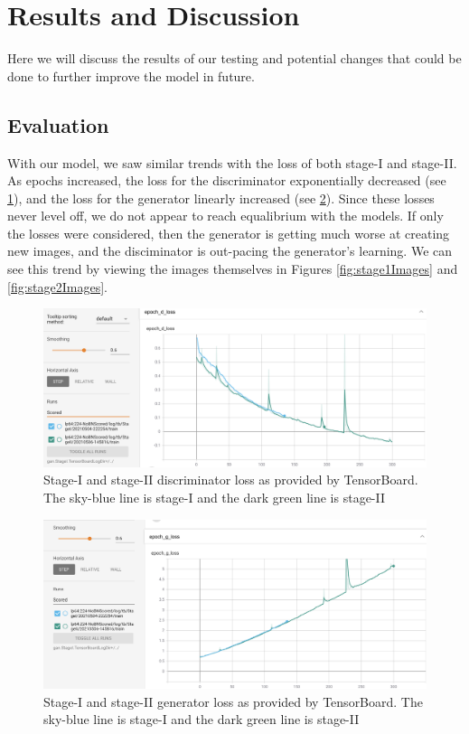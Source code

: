 \documentclass{article}
\begin{document}
	\section{Results and Discussion}
	Here we will discuss the results of our testing and potential changes that could be done to further improve the model in future.

	\subsection{Evaluation}	
	\label{sub:eval}
	With our model, we saw similar trends with the loss of both stage-I and stage-II. As epochs increased, the loss for the discriminator exponentially decreased (see \ref{fig:discrLoss}), and the loss for the generator linearly increased (see \ref{fig:genLoss}). Since these losses never level off, we do not appear to reach equalibrium with the models. If only the losses were considered, then the generator is getting much worse at creating new images, and the disciminator is out-pacing the generator's learning. We can see this trend by viewing the images themselves in Figures \ref{fig:stage1Images} and \ref{fig:stage2Images}.

	\begin{figure}[h]
	\centering
	\includegraphics[scale=0.3]{images/discriminator_tensorboard.png}
	\caption{Stage-I and stage-II discriminator loss as provided by TensorBoard. The sky-blue line is stage-I and the dark green line is stage-II}
	\label{fig:discrLoss}
	\end{figure}

	\begin{figure}[h]
	\centering
	\includegraphics[scale=0.3]{images/generator_tensorboard.png}
	\caption{Stage-I and stage-II generator loss as provided by TensorBoard. The sky-blue line is stage-I and the dark green line is stage-II}
	\label{fig:genLoss}
	\end{figure}
\end{document}

